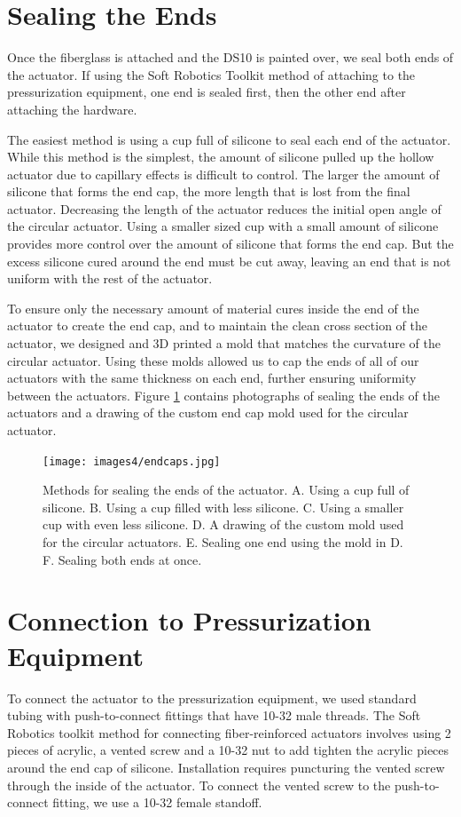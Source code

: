 \section{Sealing the Ends}
Once the fiberglass is attached and the DS10 is painted over, we seal both ends of the actuator. If using the Soft Robotics Toolkit method of attaching to the pressurization equipment, one end is sealed first, then the other end after attaching the hardware. 

The easiest method is using a cup full of silicone to seal each end of the actuator. While this method is the simplest, the amount of silicone pulled up the hollow actuator due to capillary effects is difficult to control. The larger the amount of silicone that forms the end cap, the more length that is lost from the final actuator. Decreasing the length of the actuator reduces the initial open angle of the circular actuator. Using a smaller sized cup with a small amount of silicone provides more control over the amount of silicone that forms the end cap. But the excess silicone cured around the end must be cut away, leaving an end that is not uniform with the rest of the actuator. 

To ensure only the necessary amount of material cures inside the end of the actuator to create the end cap, and to maintain the clean cross section of the actuator, we designed and 3D printed a mold that matches the curvature of the circular actuator. Using these molds allowed us to cap the ends of all of our actuators with the same thickness on each end, further ensuring uniformity between the actuators. Figure \ref{fig:endcaps} contains photographs of sealing the ends of the actuators and a drawing of the custom end cap mold used for the circular actuator. 

\begin{figure}[h!]
    \centering
    \texttt{[image: images4/endcaps.jpg]}
    \caption{Methods for sealing the ends of the actuator. A. Using a cup full of silicone. B. Using a cup filled with less silicone. C. Using a smaller cup with even less silicone. D. A drawing of the custom mold used for the circular actuators. E. Sealing one end using the mold in D. F. Sealing both ends at once. }
    \label{fig:endcaps}
\end{figure}

\section{Connection to Pressurization Equipment}
To connect the actuator to the pressurization equipment, we used standard tubing with push-to-connect fittings that have 10-32 male threads. The Soft Robotics toolkit method for connecting fiber-reinforced actuators involves using 2 pieces of acrylic, a vented screw and a 10-32 nut to add tighten the acrylic pieces around the end cap of silicone. Installation requires puncturing the vented screw through the inside of the actuator. To connect the vented screw to the push-to-connect fitting, we use a 10-32 female standoff. 

